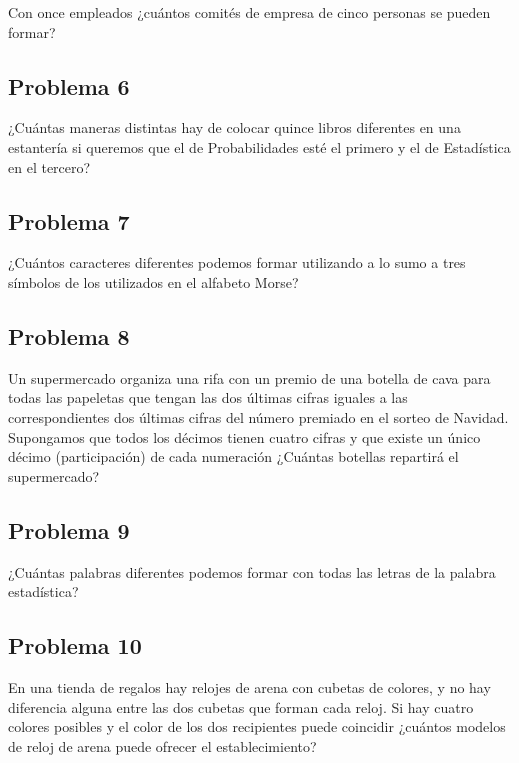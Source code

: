 \documentclass[
]{article}
\begin{document}
Con once empleados ¿cuántos comités de empresa de cinco personas se
pueden formar?

\hypertarget{problema-6}{%
\subsection{Problema 6}\label{problema-6}}

¿Cuántas maneras distintas hay de colocar quince libros diferentes en
una estantería si queremos que el de Probabilidades esté el primero y el
de Estadística en el tercero?

\hypertarget{problema-7}{%
\subsection{Problema 7}\label{problema-7}}

¿Cuántos caracteres diferentes podemos formar utilizando a lo sumo a
tres símbolos de los utilizados en el alfabeto Morse?

\hypertarget{problema-8}{%
\subsection{Problema 8}\label{problema-8}}

Un supermercado organiza una rifa con un premio de una botella de cava
para todas las papeletas que tengan las dos últimas cifras iguales a las
correspondientes dos últimas cifras del número premiado en el sorteo de
Navidad. Supongamos que todos los décimos tienen cuatro cifras y que
existe un único décimo (participación) de cada numeración ¿Cuántas
botellas repartirá el supermercado?

\hypertarget{problema-9}{%
\subsection{Problema 9}\label{problema-9}}

¿Cuántas palabras diferentes podemos formar con todas las letras de la
palabra estadística?

\hypertarget{problema-10}{%
\subsection{Problema 10}\label{problema-10}}

En una tienda de regalos hay relojes de arena con cubetas de colores, y
no hay diferencia alguna entre las dos cubetas que forman cada reloj. Si
hay cuatro colores posibles y el color de los dos recipientes puede
coincidir ¿cuántos modelos de reloj de arena puede ofrecer el
establecimiento?
\end{document}
